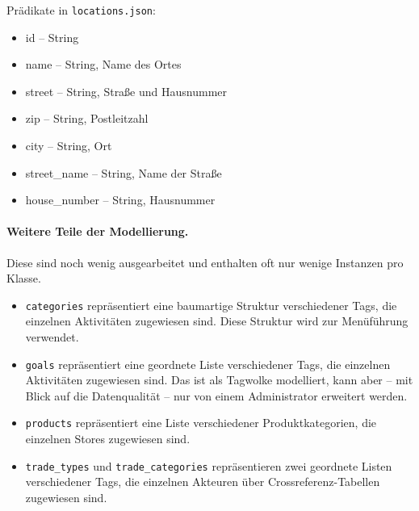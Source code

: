 \documentclass[a4paper,11pt]{article}
\begin{document}
Prädikate in \texttt{locations.json}:
\begin{itemize}\itemsep0pt
  \item id -- String	
  \item name -- String, Name des Ortes
  \item street -- String, Straße und Hausnummer
  \item zip -- String, Postleitzahl
  \item city -- String, Ort
  \item street\_name -- String, Name der Straße
  \item house\_number -- String, Hausnummer
\end{itemize}


\paragraph{Weitere Teile der Modellierung.}
Diese sind noch wenig ausgearbeitet und enthalten oft nur wenige Instanzen pro
Klasse. 
\begin{itemize}\itemsep0pt
\item \texttt{categories} repräsentiert eine baumartige Struktur verschiedener
  Tags, die einzelnen Aktivitäten zugewiesen sind.  Diese Struktur wird zur
  Menüführung verwendet. 
\item \texttt{goals} repräsentiert eine geordnete Liste verschiedener Tags, die
  einzelnen Aktivitäten zugewiesen sind. Das ist als Tagwolke modelliert, kann
  aber -- mit Blick auf die Datenqualität -- nur von einem Administrator
  erweitert werden.
\item \texttt{products} repräsentiert eine Liste verschiedener
  Produktkategorien, die einzelnen Stores zugewiesen sind.
\item \texttt{trade\_types} und \texttt{trade\_categories} repräsentieren zwei
  geordnete Listen verschiedener Tags, die einzelnen Akteuren über 
  Crossreferenz-Tabellen zugewiesen sind.
\end{itemize}
\end{document}
